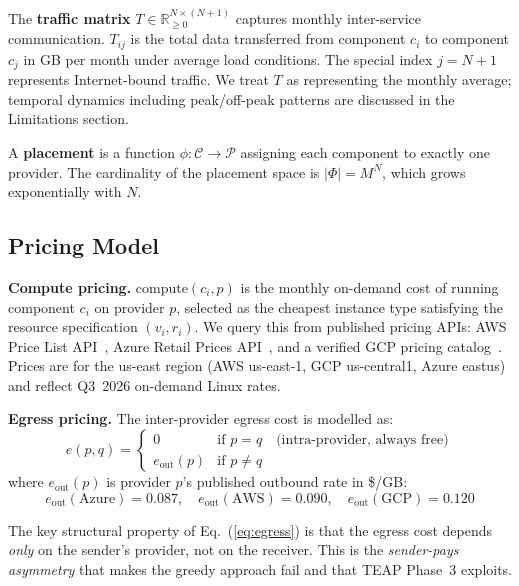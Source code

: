 \documentclass[sigconf,10pt]{acmart}
\begin{document}
The \textbf{traffic matrix} $T \in \mathbb{R}_{\geq 0}^{N \times (N+1)}$ captures
monthly inter-service communication.
$T_{ij}$ is the total data transferred from component $c_i$ to component $c_j$
in GB per month under average load conditions.
The special index $j = N+1$ represents Internet-bound traffic.
We treat $T$ as representing the monthly average; temporal dynamics including
peak/off-peak patterns are discussed in the Limitations section.

A \textbf{placement} is a function $\phi: \mathcal{C} \to \mathcal{P}$ assigning
each component to exactly one provider.
The cardinality of the placement space is $|\Phi| = M^N$, which grows
exponentially with $N$.

\subsection{Pricing Model}

\textbf{Compute pricing.}
$\text{compute}(c_i, p)$ is the monthly on-demand cost of running component $c_i$
on provider $p$, selected as the cheapest instance type satisfying the resource
specification $(v_i, r_i)$.
We query this from published pricing APIs: AWS Price List API~\cite{aws_pricing},
Azure Retail Prices API~\cite{azure_pricing}, and a verified GCP pricing
catalog~\cite{gcp_pricing}.
Prices are for the us-east region (AWS us-east-1, GCP us-central1,
Azure eastus) and reflect Q3~2026 on-demand Linux rates.

\textbf{Egress pricing.}
The inter-provider egress cost is modelled as:
\begin{equation}\label{eq:egress}
e(p, q) =
\begin{cases}
0 & \text{if } p = q \quad\text{(intra-provider, always free)}\\
e_{\text{out}}(p) & \text{if } p \neq q
\end{cases}
\end{equation}
where $e_{\text{out}}(p)$ is provider $p$'s published outbound rate in \$/GB:
\begin{equation}\label{eq:rates}
e_{\text{out}}(\text{Azure}) = 0.087, \quad
e_{\text{out}}(\text{AWS}) = 0.090, \quad
e_{\text{out}}(\text{GCP}) = 0.120
\end{equation}

The key structural property of Eq.~(\ref{eq:egress}) is that the egress cost depends
\emph{only} on the sender's provider, not on the receiver.
This is the \emph{sender-pays asymmetry} that makes the greedy approach fail and
that TEAP Phase~3 exploits.
\end{document}
